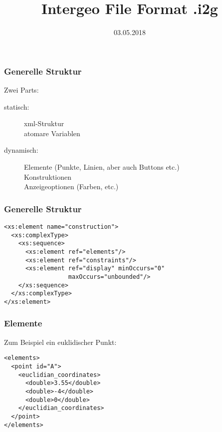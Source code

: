 \documentclass[11pt]{beamer}
\begin{document}
	\title{Intergeo File Format .i2g}
	\date{03.05.2018}
	\frame[plain]{\maketitle}
	
	\begin{frame}%
		\frametitle{Generelle Struktur}
		\noindent
		Zwei Parts:
		\begin{description}
			\item[statisch:] xml-Struktur\\
			atomare Variablen
			\item[dynamisch:] Elemente (Punkte, Linien, aber auch Buttons etc.)\\
			Konstruktionen\\
			Anzeigeoptionen (Farben, etc.)
		\end{description}
	\end{frame}

	\begin{frame}[fragile]
		\frametitle{Generelle Struktur}
		\begin{lstlisting}
<xs:element name="construction">
  <xs:complexType>
    <xs:sequence>
      <xs:element ref="elements"/>
      <xs:element ref="constraints"/>
      <xs:element ref="display" minOccurs="0" 
                  maxOccurs="unbounded"/>
    </xs:sequence>
  </xs:complexType>
</xs:element>
		\end{lstlisting}
	\end{frame}

	\begin{frame}[fragile]
		\frametitle{Elemente}
		Zum Beispiel ein euklidischer Punkt:
		\begin{lstlisting}
<elements>
  <point id="A">
    <euclidian_coordinates>
      <double>3.55</double>
      <double>-4</double>
      <double>0</double>
    </euclidian_coordinates>
  </point>
</elements>
		\end{lstlisting}
	\end{frame}
\end{document}
